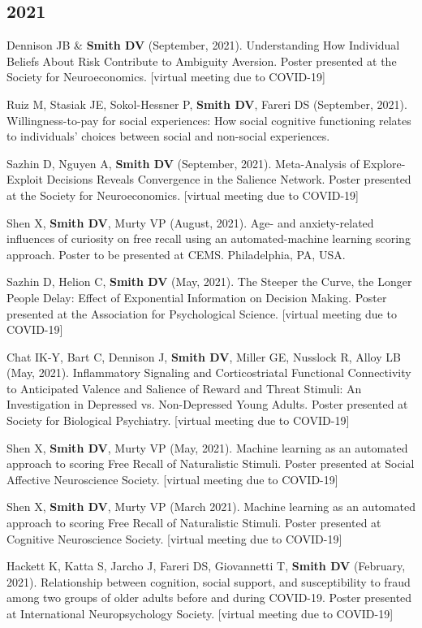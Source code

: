 \documentclass[11pt, letterpaper]{article}
\begin{document}
\subsection*{2021}
\begin{hangparas}{.5in}{1}

Dennison JB \& \textbf{Smith DV} (September, 2021). Understanding How Individual Beliefs About Risk Contribute to Ambiguity Aversion. Poster presented at the Society for Neuroeconomics. [virtual meeting due to COVID-19]

Ruiz M, Stasiak JE, Sokol-Hessner P, \textbf{Smith DV}, Fareri DS (September, 2021). Willingness-to-pay for social experiences: How social cognitive functioning relates to individuals' choices between social and non-social experiences. 

Sazhin D, Nguyen A, \textbf{Smith DV} (September, 2021). Meta-Analysis of Explore-Exploit Decisions Reveals Convergence in the Salience Network. Poster presented at the Society for Neuroeconomics. [virtual meeting due to COVID-19]

Shen X, \textbf{Smith DV}, Murty VP (August, 2021). Age- and anxiety-related influences of curiosity on free recall using an automated-machine learning scoring approach. Poster to be presented at CEMS. Philadelphia, PA, USA.

Sazhin D, Helion C, \textbf{Smith DV} (May, 2021). The Steeper the Curve, the Longer People Delay: Effect of Exponential Information on Decision Making. Poster presented at the Association for Psychological Science. [virtual meeting due to COVID-19]

Chat IK-Y, Bart C, Dennison J, \textbf{Smith DV}, Miller GE, Nusslock R, Alloy LB (May, 2021). Inflammatory Signaling and Corticostriatal Functional Connectivity to Anticipated Valence and Salience of Reward and Threat Stimuli: An Investigation in Depressed vs. Non-Depressed Young Adults. Poster presented at Society for Biological Psychiatry. [virtual meeting due to COVID-19]

Shen X, \textbf{Smith DV}, Murty VP (May, 2021). Machine learning as an automated approach to scoring Free Recall of Naturalistic Stimuli. Poster presented at Social Affective Neuroscience Society. [virtual meeting due to COVID-19]

Shen X, \textbf{Smith DV}, Murty VP (March 2021). Machine learning as an automated approach to scoring Free Recall of Naturalistic Stimuli. Poster presented at Cognitive Neuroscience Society. [virtual meeting due to COVID-19]

Hackett K, Katta S, Jarcho J, Fareri DS, Giovannetti T, \textbf{Smith DV} (February, 2021). Relationship between cognition, social support, and susceptibility to fraud among two groups of older adults before and during COVID-19. Poster presented at International Neuropsychology Society. [virtual meeting due to COVID-19]

\end{hangparas}
\end{document}
